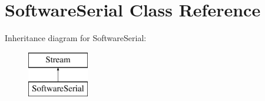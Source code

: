 \hypertarget{class_software_serial}{}\section{Software\+Serial Class Reference}
\label{class_software_serial}
Inheritance diagram for Software\+Serial\+:\begin{figure}[H]
\begin{center}
\leavevmode
\includegraphics[height=2.000000cm]{class_software_serial}
\end{center}
\end{figure}
